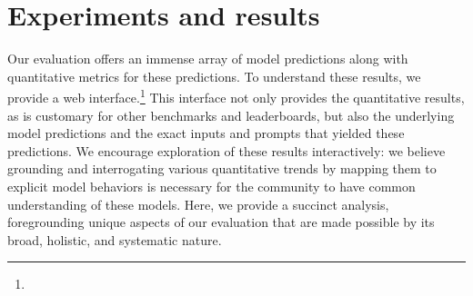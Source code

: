 \hypertarget{experiments}{\section{Experiments and results}}
\label{sec:experiments}

Our evaluation offers an immense array of model predictions along with quantitative metrics for these predictions.
To understand these results, we provide a web interface.\footnote{\benchmarkUrl}
This interface not only provides the quantitative results, as is customary for other benchmarks and leaderboards, but also the underlying model predictions and the exact inputs and prompts that yielded these predictions. 
We encourage exploration of these results interactively: we believe grounding and interrogating various quantitative trends by mapping them to explicit model behaviors is necessary for the community to have common understanding of these models.
Here, we provide a succinct analysis, foregrounding unique aspects of our evaluation that are made possible by its broad, holistic, and systematic nature. 


\clearpage

\clearpage

\clearpage
% 

\clearpage
